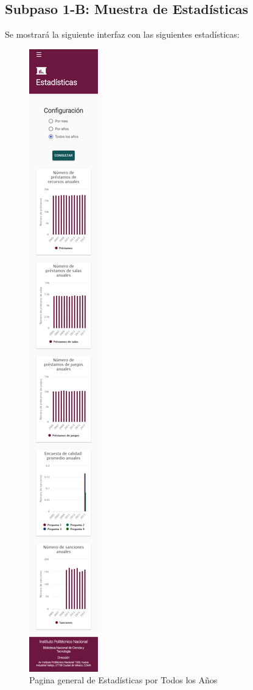 \subsection{Subpaso 1-B: Muestra de Estadísticas}
	Se mostrará la siguiente interfaz con las siguientes estadísticas:
	\begin{figure}[hbtp]
		\includegraphics[scale=0.3]{images/InterfazMovil/IUGS15_estadisticasTodos.PNG}
		\caption{Pagina general de Estadísticas por Todos los Años}
	\end{figure}	
	
